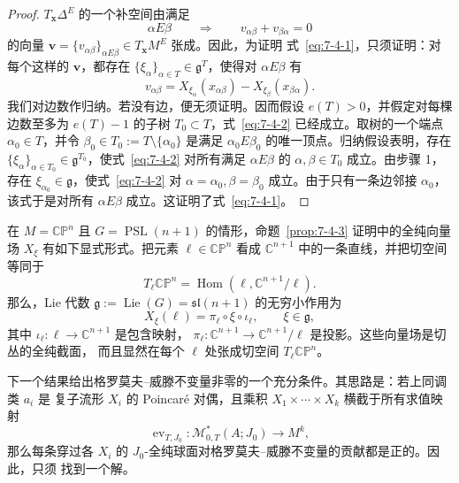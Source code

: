 \begin{proof}
$T_{\mathbf x}\Delta^E$ 的一个补空间由满足
\[
  \alpha E\beta\qquad\Longrightarrow\qquad
  v_{\alpha\beta}+v_{\beta\alpha}=0
\]
的向量
$\mathbf v=\{v_{\alpha\beta}\}_{\alpha E\beta}\in T_{\mathbf x}M^E$ 张成。因此，为证明
式~\eqref{eq:7-4-1}，只须证明：对每个这样的 $\mathbf v$，都存在
$\{\xi_\alpha\}_{\alpha\in T}\in\mathfrak g^T$，使得对 $\alpha E\beta$ 有
\begin{equation}\label{eq:7-4-2}
  v_{\alpha\beta}
  =X_{\xi_\alpha}(x_{\alpha\beta})
   -X_{\xi_\beta}(x_{\beta\alpha}).
\end{equation}
我们对边数作归纳。若没有边，便无须证明。因而假设 $e(T)>0$，并假定对每棵边数至多为
$e(T)-1$ 的子树 $T_0\subset T$，式~\eqref{eq:7-4-2} 已经成立。取树的一个端点
$\alpha_0\in T$，并令 $\beta_0\in T_0:=T\setminus\{\alpha_0\}$ 是满足
$\alpha_0E\beta_0$ 的唯一顶点。归纳假设表明，存在
$\{\xi_\alpha\}_{\alpha\in T_0}\in\mathfrak g^{T_0}$，使式~\eqref{eq:7-4-2}
对所有满足 $\alpha E\beta$ 的 $\alpha,\beta\in T_0$ 成立。由步骤 1，存在
$\xi_{\alpha_0}\in\mathfrak g$，使式~\eqref{eq:7-4-2} 对
$\alpha=\alpha_0,\beta=\beta_0$ 成立。由于只有一条边邻接 $\alpha_0$，该式于是对所有
$\alpha E\beta$ 成立。这证明了式~\eqref{eq:7-4-1}。
\end{proof}

\begin{remark}\label{rem:7-4-4}
在 $M=\mathbb{CP}^n$ 且 $G=\operatorname{PSL}(n+1)$ 的情形，命题~\ref{prop:7-4-3}
证明中的全纯向量场 $X_\xi$ 有如下显式形式。把元素
$\ell\in\mathbb{CP}^n$ 看成 $\mathbb C^{n+1}$ 中的一条直线，并把切空间等同于
\[
  T_\ell\mathbb{CP}^n
  =\operatorname{Hom}(\ell,\mathbb C^{n+1}/\ell).
\]
那么，Lie 代数
$\mathfrak g:=\operatorname{Lie}(G)=\mathfrak{sl}(n+1)$ 的无穷小作用为
\[
  X_\xi(\ell)=\pi_\ell\circ\xi\circ\iota_\ell,
  \qquad \xi\in\mathfrak g,
\]
其中 $\iota_\ell:\ell\to\mathbb C^{n+1}$ 是包含映射，
$\pi_\ell:\mathbb C^{n+1}\to\mathbb C^{n+1}/\ell$ 是投影。这些向量场是切丛的全纯截面，
而且显然在每个 $\ell$ 处张成切空间 $T_\ell\mathbb{CP}^n$。
\end{remark}

下一个结果给出格罗莫夫--威滕不变量非零的一个充分条件。其思路是：若上同调类 $a_i$ 是
复子流形 $X_i$ 的 Poincaré 对偶，且乘积 $X_1\times\cdots\times X_k$ 横截于所有求值映射
\[
  \operatorname{ev}_{T,J_0}:\mathcal M^*_{0,T}(A;J_0)\longrightarrow M^k,
\]
那么每条穿过各 $X_i$ 的 $J_0$-全纯球面对格罗莫夫--威滕不变量的贡献都是正的。因此，只须
找到一个解。

